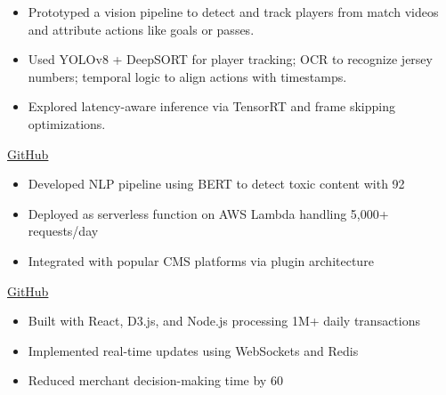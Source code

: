 
\smallskip
\begin{itemize}
\item Prototyped a vision pipeline to detect and track players from match videos and attribute actions like goals or passes.
\item Used YOLOv8 + DeepSORT for player tracking; OCR to recognize jersey numbers; temporal logic to align actions with timestamps.
\item Explored latency-aware inference via TensorRT and frame skipping optimizations.
\end{itemize}
\bigskip

\smallskip
\href{https://github.com/superdev/ai-moderator}{\faGithub \hspace{0.5em}GitHub}
\smallskip
\begin{itemize}
\item Developed NLP pipeline using BERT to detect toxic content with 92%
\item Deployed as serverless function on AWS Lambda handling 5,000+ requests/day
\item Integrated with popular CMS platforms via plugin architecture
\end{itemize}
\bigskip

\smallskip
\href{https://github.com/superdev/ecommerce-analytics}{\faGithub \hspace{0.5em}GitHub}
\smallskip
\begin{itemize}
\item Built with React, D3.js, and Node.js processing 1M+ daily transactions
\item Implemented real-time updates using WebSockets and Redis
\item Reduced merchant decision-making time by 60%
\end{itemize}